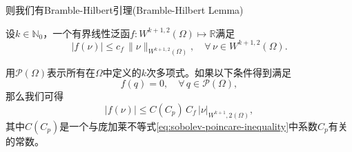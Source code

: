 则我们有Bramble-Hilbert引理(Bramble-Hilbert Lemma)
\begin{lemma}
  \label{lemma:bramble-hilbert-lemma}
  设$k \in \mathbb{N}_0$，一个有界线性泛函$f:W^{k+1,2}(\Omega) \mapsto \mathbb{R}$满足
  \begin{equation*}
    \left| f(\nu) \right| \le c_f \, \| \nu \|_{W^{k+1,2}(\Omega)}, \quad \forall \, \nu \in W^{k+1,2}(\Omega).
  \end{equation*}

用$\mathcal{P}(\Omega)$表示所有在$\Omega$中定义的$k$次多项式。如果以下条件得到满足
\begin{equation*}
  f(q) = 0, \quad \forall \, q \in \mathcal{P}(\Omega),
\end{equation*}
那么我们可得
\begin{equation}
  \label{eq:bramble-hilbert-lemma}
  \big| f(\nu) \big| \le C(C_p) \, C_f \, \big| \nu \big|_{W^{k+1},2(\Omega)},
\end{equation}
其中$C(C_p)$是一个与庞加莱不等式\eqref{eq:sobolev-poincare-inequality}中系数$C_p$有关的常数。
\end{lemma}
